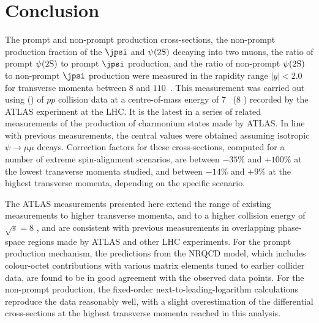 \section{Conclusion}
\label{sec:conclusion}

The prompt and non-prompt production cross-sections, the non-prompt production fraction of the $\jpsi$ and $\psi(2\mathrm{S})$
decaying into two muons, the ratio of prompt $\psi(2\mathrm{S})$ to prompt $\jpsi$ production, and the ratio of non-prompt $\psi(2\mathrm{S})$ to non-prompt $\jpsi$ production
were measured in the rapidity range
$|y|<2.0$ for transverse momenta between $8$ and $110$~\GeV. This measurement was carried out using \lumiA (\lumiB) of $pp$
collision data at a centre-of-mass energy of $7$ \TeV\ ($8$ \TeV) recorded by the ATLAS experiment at the LHC. It is the latest in a series of 
related measurements of the production of charmonium states
made by ATLAS.
In line with previous measurements, the central values were obtained 
assuming isotropic $\psi \to \mu\mu$ decays.
Correction factors for these cross-sections, computed for a number of extreme spin-alignment scenarios, are between $-35\%$ and $+100\%$ at the lowest transverse momenta studied, and between $-14\%$ and $+9\%$ at the highest transverse momenta, depending on the specific scenario.

The ATLAS measurements presented here extend the range of existing measurements to higher transverse momenta, and to a higher collision energy of $\sqrt{s} = 8$ \TeV, and are consistent with previous measurements in overlapping phase-space regions made by ATLAS 
and other LHC experiments.
For the prompt production mechanism, the predictions from the NRQCD model, which includes colour-octet contributions with various matrix elements 
tuned to earlier collider data, are found to be in good agreement with the observed data points. 
For the non-prompt production, the fixed-order next-to-leading-logarithm calculations reproduce the data reasonably well, with a slight overestimation of the differential cross-sections at the highest 
transverse momenta reached in this analysis.
